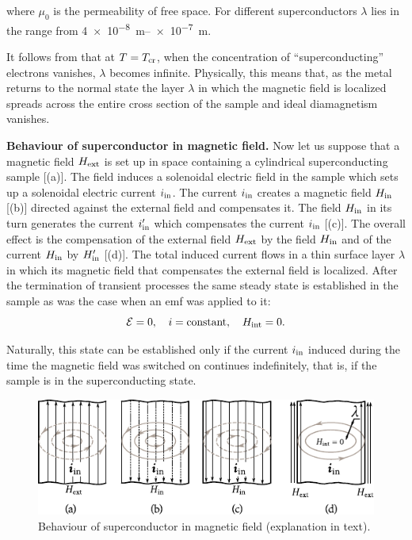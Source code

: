 \noindent
where $\mu_0$ is the permeability of free space. For different superconductors $\lambda$ lies in the range from \SIrange{4e-8}{e-7}{\metre}.

It follows from  that at $T=T_{\text{cr}}$, when the concentration of ``superconducting'' electrons vanishes, $\lambda$ becomes infinite. Physically, this means that, as the metal returns to the normal state the layer $\lambda$ in which the magnetic field is localized spreads across the entire cross section of the sample and ideal diamagnetism vanishes.

\textbf{Behaviour of superconductor in magnetic field.} Now let us suppose that a magnetic field $H_{\text{ext}}$ is set up in space containing a cylindrical superconducting sample [(a)]. The field induces a solenoidal electric field in the sample which sets up a solenoidal electric current $i_{\text{in}}$. The current $i_{\text{in}}$ creates a magnetic field $H_{\text{in}}$ [(b)] directed against the external field and compensates it.
The field $H_{\text{in}}$ in its turn generates the current $i_{\text{in}}'$ which compensates the current $i_{\text{in}}$ [(c)]. The overall effect is the compensation of the external field $H_{\text{ext}}$ by the field $H_{\text{in}}$ and of the current $H_{\text{in}}$ by $H_{\text{in}}'$ [(d)].
The total induced current flows in a thin surface layer $\lambda$ in which its magnetic field that compensates the external field is localized. After the termination of transient processes the same steady state is established in the sample as was the case when an emf was applied to it:
\begin{equation*}
	\mathcal{E}=0,\quad i=\text{constant},\quad H_{\text{int}}=0.
\end{equation*}

\noindent
Naturally, this state can be established only if the current $i_{\text{in}}$ induced during the time the magnetic field was switched on continues indefinitely, that is, if the sample is in the superconducting state.

\begin{figure}[t]
	\begin{center}
		\includegraphics[scale=1.2]{figures/ch_06/fig_6_36.pdf}
		\caption[]{Behaviour of superconductor in magnetic field (explanation in text).}
		\label{fig:6_36}
	\end{center}
	\vspace{-0.7cm}
\end{figure}

